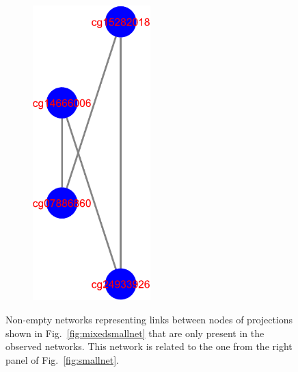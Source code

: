 \documentclass[10pt,a4paper]{article}
\begin{document}
\begin{figure}[h!]
\centering
\begin{subfigure}{0.2\textwidth}
\includegraphics[width=0.5\textwidth]{small-DNA-mixed-CC-15-notinproj.pdf}
\end{subfigure}
\caption{\label{fig:mixedsmallnetnotinproj} Non-empty networks representing links between nodes of projections shown in Fig.~\ref{fig:mixedsmallnet} that are only present in the observed networks. This network is related to the one from the right panel of Fig.~\ref{fig:smallnet}.}
\end{figure}
\printbibliography
\end{document}
